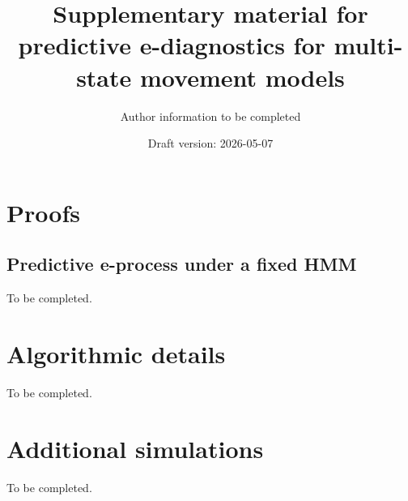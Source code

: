 \documentclass[11pt]{article}
\title{Supplementary material for predictive e-diagnostics for multi-state movement models}
\author{Author information to be completed}
\date{Draft version: 2026-05-07}
\begin{document}
\maketitle

\section{Proofs}

\subsection{Predictive e-process under a fixed HMM}

To be completed.

\section{Algorithmic details}

To be completed.

\section{Additional simulations}

To be completed.



\end{document}
